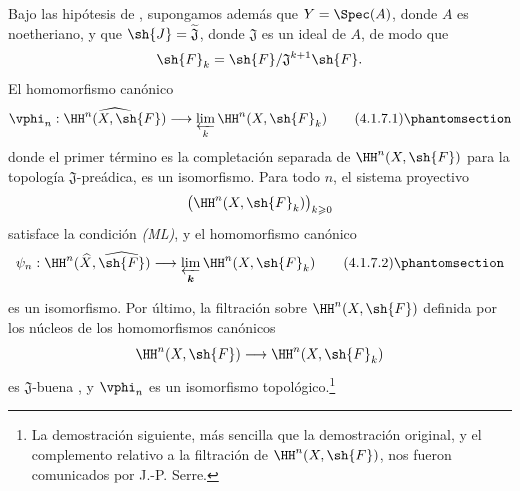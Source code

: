 \documentclass[oneside]{amsart}
\renewcommand{\geq}{\geqslant}
\newcommand{\oldpage}[2][]{{\marginnote{\normalfont\textbf{#1}~|~#2}}\ignorespaces}
\let\EGAOriginalLabel\label
\renewcommand{\label}[1]{\phantomsection\EGAOriginalLabel{#1}}
\begin{document}
\begin{corollary}[4.1.7]
\label{III.4.1.7}
Bajo las hipótesis de , supongamos además que
$Y=\Spec(A)$, donde $A$ es noetheriano, y que
$\sh{J}=\widetilde{\mathfrak{J}}$, donde $\mathfrak{J}$ es un ideal
de $A$, de modo que
\[
  \sh{F}_k=\sh{F}/\mathfrak{J}^{k+1}\sh{F}.
\]
El homomorfismo canónico
\[
  \vphi_n:
  \widehat{\HH^n(X,\sh{F})}
  \longrightarrow
  \varprojlim_k\HH^n(X,\sh{F}_k)
  \tag{4.1.7.1}
  \label{III.4.1.7.1}
\]
donde el primer término es la completación separada de
$\HH^n(X,\sh{F})$ para la topología $\mathfrak{J}$-preádica, es un
isomorfismo.
Para todo $n$, el sistema proyectivo
\[
  \bigl(\HH^n(X,\sh{F}_k)\bigr)_{k\geq0}
\]
satisface la condición \emph{(ML)}, y el homomorfismo canónico
\[
  \psi_n:
  \HH^n(\widehat{X},\widehat{\sh{F}})
  \longrightarrow
  \varprojlim_{\boldsymbol{k}}\HH^n(X,\sh{F}_k)
  \tag{4.1.7.2}
  \label{III.4.1.7.2}
\]

\oldpage[III]{126}

es un isomorfismo.
Por último, la filtración sobre $\HH^n(X,\sh{F})$ definida por los
núcleos de los homomorfismos canónicos
\[
  \HH^n(X,\sh{F})\longrightarrow\HH^n(X,\sh{F}_k)
\]
es $\mathfrak{J}$-buena , y $\vphi_n$ es un
isomorfismo topológico.\footnote{La demostración siguiente, más sencilla
que la demostración original, y el complemento relativo a la filtración
de $\HH^n(X,\sh{F})$, nos fueron comunicados por J.-P. Serre.}
\end{corollary}
\end{document}
